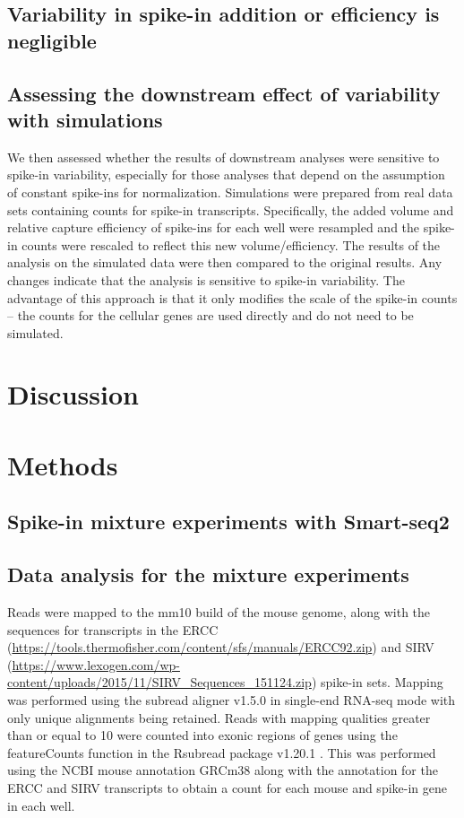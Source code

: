 \documentclass{article}
\begin{document}
\subsection{Variability in spike-in addition or efficiency is negligible}

\subsection{Assessing the downstream effect of variability with simulations}
We then assessed whether the results of downstream analyses were sensitive to spike-in variability, especially for those analyses that depend on the assumption of constant spike-ins for normalization.
Simulations were prepared from real data sets containing counts for spike-in transcripts.
Specifically, the added volume and relative capture efficiency of spike-ins for each well were resampled and the spike-in counts were rescaled to reflect this new volume/efficiency.
The results of the analysis on the simulated data were then compared to the original results.
Any changes indicate that the analysis is sensitive to spike-in variability.
The advantage of this approach is that it only modifies the scale of the spike-in counts -- the counts for the cellular genes are used directly and do not need to be simulated.

\section{Discussion}

\section{Methods}

\subsection{Spike-in mixture experiments with Smart-seq2}

\subsection{Data analysis for the mixture experiments}
Reads were mapped to the mm10 build of the mouse genome, along with the sequences for transcripts in the ERCC (\url{https://tools.thermofisher.com/content/sfs/manuals/ERCC92.zip}) and SIRV (\url{https://www.lexogen.com/wp-content/uploads/2015/11/SIRV_Sequences_151124.zip}) spike-in sets.
Mapping was performed using the subread aligner v1.5.0 \cite{liao2013subread} in single-end RNA-seq mode with only unique alignments being retained.
Reads with mapping qualities greater than or equal to 10 were counted into exonic regions of genes using the featureCounts function in the Rsubread package v1.20.1 \cite{liao2014featurecounts}.
This was performed using the NCBI mouse annotation GRCm38 along with the annotation for the ERCC and SIRV transcripts to obtain a count for each mouse and spike-in gene in each well.
\end{document}
